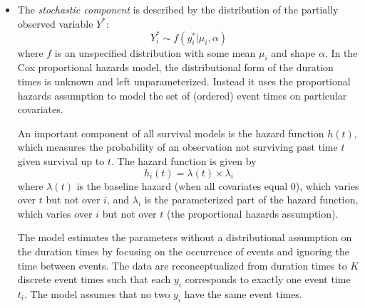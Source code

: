 \begin{itemize}
\item The \textit{stochastic component} is described by the distribution of the partially observed variable $Y^*$:
\begin{equation*}
Y_i^* \sim f(y_i^* | \mu_i, \alpha)
\end{equation*}
where $f$ is an unspecified distribution with some mean $\mu_i$ and shape $\alpha$.  In the Cox proportional hazards model, the distributional form of the duration times is unknown and left unparameterized.  Instead it uses the proportional hazards assumption to model the set of (ordered) event times on particular covariates.

An important component of all survival models is the hazard function $h(t)$, which measures the probability of an observation not surviving past time $t$ given survival up to $t$.  The hazard function is given by 
\begin{equation*}
h_i(t) = \lambda(t) \times \lambda_i
\end{equation*}
where $\lambda(t)$ is the baseline hazard (when all covariates equal 0), which varies over $t$ but not over $i$, and $\lambda_i$ is the parameterized part of the hazard function, which varies over $i$ but not over $t$ (the proportional hazards assumption).

The model estimates the parameters without a distributional assumption on the duration times by focusing on the occurrence of events and ignoring the time between events.  The data are reconceptualized from duration times to $K$ discrete event times such that each $y_i$ corresponds to exactly one event time $t_i$.  The model assumes that no two $y_i$ have the same event times.  


\end{itemize}

